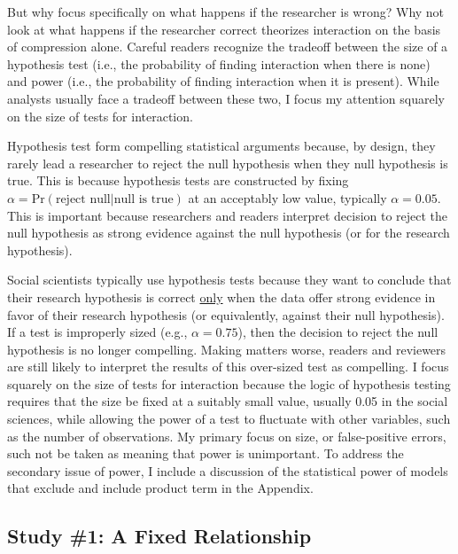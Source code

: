 \documentclass[12pt]{article}
\begin{document}
But why focus specifically on what happens if the researcher is wrong? Why not look at what happens if the researcher correct theorizes interaction on the basis of compression alone. Careful readers recognize the tradeoff between the size of a hypothesis test (i.e., the probability of finding interaction when there is none) and power (i.e., the probability of finding interaction when it is present). While analysts usually face a tradeoff between these two, I focus my attention squarely on the size of tests for interaction.

Hypothesis test form compelling statistical arguments because, by design, they rarely lead a researcher to reject the null hypothesis when they null hypothesis is true. This is because hypothesis tests are constructed by fixing $\alpha = \text{Pr}(\text{reject null} | \text{null is true})$  at an acceptably low value, typically $\alpha = 0.05$. This is important because researchers and readers interpret decision to reject the null hypothesis as strong evidence against the null hypothesis (or for the research hypothesis).


Social scientists typically use hypothesis tests because they want to conclude that their research hypothesis is correct \underline{only} when the data offer strong evidence in favor of their research hypothesis (or equivalently, against their null hypothesis). If a test is improperly sized (e.g., $\alpha = 0.75$), then the decision to reject the null hypothesis is no longer compelling. Making matters worse, readers and reviewers are still likely to interpret the results of this over-sized test as compelling. I focus squarely on the size of tests for interaction because the logic of hypothesis testing requires that the size be fixed at a suitably small value, usually 0.05 in the social sciences, while allowing the power of a test to fluctuate with other variables, such as the number of observations. My primary focus on size, or false-positive errors, such not be taken as meaning that power is unimportant. To address the secondary issue of power, I include a discussion of the statistical power of models that exclude and include product term in the Appendix. 



\subsection*{Study \#1: A Fixed Relationship} 
\end{document}
